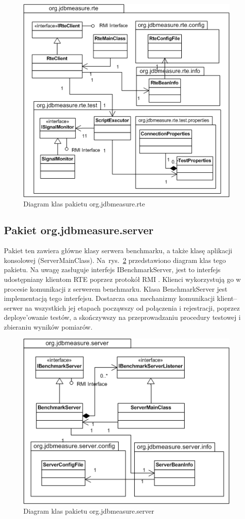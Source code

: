 \begin{figure}[h]
\begin{center}
\includegraphics[width=0.8\linewidth]{figures/uml05.png}
\end{center}
\caption{Diagram klas pakietu org.jdbmeasure.rte}\label{rys:uml05}
\end{figure}

\subsection{Pakiet org.jdbmeasure.server}
Pakiet ten zawiera główne klasy serwera benchmarku, a także klasę aplikacji konsolowej (ServerMainClass).
Na~rys.~\ref{rys:uml06} przedstawiono diagram klas tego pakietu. Na uwagę zasługuje interfejs IBenchmarkServer,
jest to interfejs udostępniany klientom RTE poprzez protokół RMI . Klienci wykorzystują go w procesie komunikacji
z serwerem benchmarku. Klasa BenchmarkServer jest implementacją tego interfejsu. Dostarcza ona mechanizmy komunikacji
klient--serwer na wszystkich jej etapach począwszy od połączenia i rejestracji, poprzez deploye'owanie testów,
a skończywszy na przeprowadzaniu procedury testowej i zbieraniu wyników pomiarów.
\begin{figure}[h]
\begin{center}
\includegraphics[width=0.8\linewidth]{figures/uml06.png}
\end{center}
\caption{Diagram klas pakietu org.jdbmeasure.server}\label{rys:uml06}
\end{figure}

